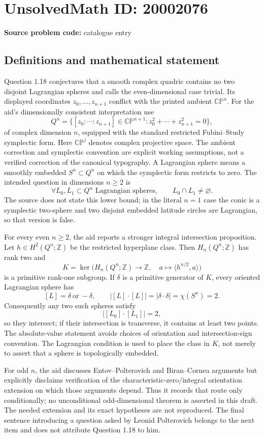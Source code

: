\documentclass[11pt]{article}
\newcommand{\Z}{\mathbb{Z}}
\newcommand{\C}{\mathbb{C}}
\newcommand{\PP}{\mathbb{P}}
\begin{document}
\section*{UnsolvedMath ID: 20002076}
\textbf{Source problem code:} catalogue entry
\subsection{Definitions and mathematical statement}
Question 1.18 conjectures that a smooth complex quadric contains no two disjoint Lagrangian spheres and calls the even-dimensional case trivial. Its displayed coordinates \(z_0,\ldots,z_{n+1}\) conflict with the printed ambient \(\C\PP^n\). For the aid's dimensionally consistent interpretation use
\[
 Q^n=\{[z_0:\cdots:z_{n+1}]\in\C\PP^{n+1}:
 z_0^2+\cdots+z_{n+1}^2=0\},
\]
of complex dimension \(n\), equipped with the standard restricted Fubini--Study symplectic form. Here \(\C\PP^j\) denotes complex projective space. The ambient correction and symplectic convention are explicit working assumptions, not a verified correction of the canonical typography. A Lagrangian sphere means a smoothly embedded \(S^n\subset Q^n\) on which the symplectic form restricts to zero. The intended question in dimensions \(n\ge2\) is
\[
 \forall L_0,L_1\subset Q^n\text{ Lagrangian spheres},\qquad L_0\cap L_1\ne\varnothing.
\]
The source does not state this lower bound; in the literal \(n=1\) case the conic is a symplectic two-sphere and two disjoint embedded latitude circles are Lagrangian, so that version is false.

For every even \(n\ge2\), the aid reports a stronger integral intersection proposition. Let \(h\in H^2(Q^n;\Z)\) be the restricted hyperplane class. Then \(H_n(Q^n;\Z)\) has rank two and
\[
 K=\ker\bigl(H_n(Q^n;\Z)\longrightarrow\Z,
 \quad a\longmapsto\langle h^{n/2},a\rangle\bigr)
\]
is a primitive rank-one subgroup. If \(\delta\) is a primitive generator of \(K\), every oriented Lagrangian sphere has
\[
 [L]=\delta\ \text{or}\ -\delta,
 \qquad |[L]\cdot[L]|=|\delta\cdot\delta|=\chi(S^n)=2.
\]
Consequently any two such spheres satisfy
\[
 |[L_0]\cdot[L_1]|=2,
\]
so they intersect; if their intersection is transverse, it contains at least two points. The absolute-value statement avoids choices of orientation and intersection-sign convention. The Lagrangian condition is used to place the class in \(K\), not merely to assert that a sphere is topologically embedded.

For odd \(n\), the aid discusses Entov--Polterovich and Biran--Cornea arguments but explicitly disclaims verification of the characteristic-zero/integral orientation extension on which those arguments depend. Thus it records that route only conditionally; no unconditional odd-dimensional theorem is asserted in this draft. The needed extension and its exact hypotheses are not reproduced. The final sentence introducing a question asked by Leonid Polterovich belongs to the next item and does not attribute Question 1.18 to him.
\end{document}
